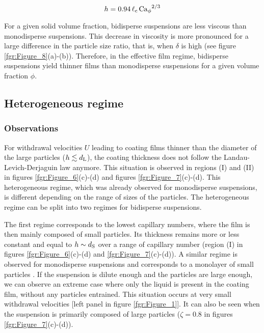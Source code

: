 \documentclass{jfm}
\begin{document}
\begin{equation}
    h=0.94\,\ell_c\,{{\rm Ca}_\phi}^{2/3}
\end{equation}

For a given solid volume fraction, bidisperse suspensions are less viscous than monodisperse suspensions. This decrease in viscosity is more pronounced for a large difference in the particle size ratio, that is, when $\delta$ is high (see figure \ref{fgr:Figure_8}(a)-(b)). Therefore, in the effective film regime, bidisperse suspensions yield thinner films than monodisperse suspensions for a given volume fraction $\phi$.

\subsection{Heterogeneous regime} \label{sec:heterogeneous}

 \subsubsection{Observations}
 
For withdrawal velocities $U$ leading to coating films thinner than the diameter of the large particles  ($h \lesssim d_{\rm L}$), the coating thickness does not follow the Landau-Levich-Derjaguin law anymore. This situation is observed in regions (I) and (II) in figures \ref{fgr:Figure_6}(c)-(d) and figures \ref{fgr:Figure_7}(c)-(d). This heterogeneous regime, which was already observed for monodisperse suspensions, is different depending on the range of sizes of the particles. The heterogeneous regime can be split into two regimes for bidisperse suspensions.

The first regime corresponds to the lowest capillary numbers, where the film is then mainly composed of small particles. Its thickness remains more or less constant and equal to $h \sim d_{\rm S}$ over a range of capillary number  (region (I) in figures \ref{fgr:Figure_6}(c)-(d) and \ref{fgr:Figure_7}(c)-(d)). A similar regime is observed for monodisperse suspensions and corresponds to a monolayer of small particles \cite[][]{gans2019dip,palma2019dip}. If the suspension is dilute enough and the particles are large enough, we can observe an extreme case where only the liquid is present in the coating film, without any particles entrained. This situation occurs at very small withdrawal velocities [left panel in figure \ref{fgr:Figure_1}]. It can also be seen when the suspension is primarily composed of large particles ($\zeta=0.8$ in figures \ref{fgr:Figure_7}(c)-(d)).
 
\end{document}

